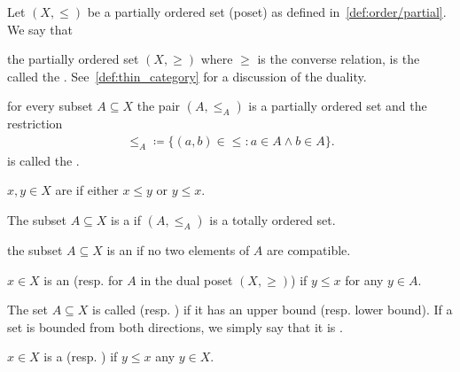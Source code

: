 \begin{definition}\label{def:poset}
  Let $(X, \leq)$ be a partially ordered set (poset) as defined in~\cref{def:order/partial}. We say that

  \begin{defenum}
    \item\label{def:poset/dual} the partially ordered set $(X, \geq)$ where $\geq$ is the converse relation, is the called the . See~\cref{def:thin_category} for a discussion of the duality.

    \item\label{def:poset/subset_order} for every subset $A \subseteq X$ the pair $(A, \leq_A)$ is a partially ordered set and the restriction
    \begin{align*}
      \leq_A \coloneqq \{ (a, b) \in \leq \colon a \in A \land b \in A \}.
    \end{align*}
    is called the .

    \item\label{def:poset/comparable_elements} $x, y \in X$ are  if either $x \leq y$ or $y \leq x$.

    \item\label{def:poset/chain} The subset $A \subseteq X$ is a  if $(A, \leq_A)$ is a totally ordered set.

    \item\label{def:poset/antichain} the subset $A \subseteq X$ is an  if no two elements of $A$ are compatible.

    \item\label{def:poset/upper_lower_bound}\cite[170]{Enderton1977} $x \in X$ is an  (resp.  for $A$ in the dual poset $(X, \geq)$) if $y \leq x$ for any $y \in A$.

    \item\label{def:poset/bounded_set} The set $A \subseteq X$ is called  (resp. ) if it has an upper bound (resp. lower bound). If a set is bounded from both directions, we simply say that it is .

    \item\label{def:poset/largest_smallest_element}\cite[171]{Enderton1977} $x \in X$ is a  (resp. ) if $y \leq x$ any $y \in X$.


\end{defenum}
\end{definition}
